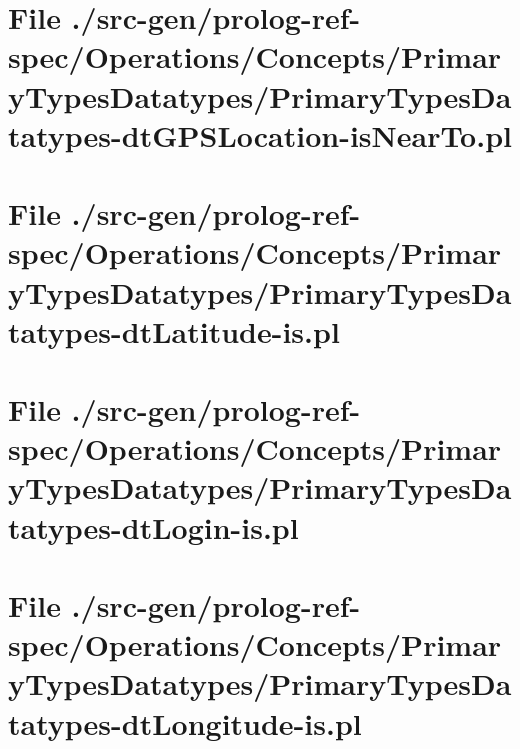 \section[File /src-gen.../PrimaryTypesDatatypes-dtGPSLocation-isNearTo.pl]{File ./src-gen/prolog-ref-spec/Operations/Concepts/PrimaryTypesDatatypes/PrimaryTypesDatatypes-dtGPSLocation-isNearTo.pl}
\scriptsize

\normalsize
	
\section[File /src-gen/prolog-ref-spec.../PrimaryTypesDatatypes-dtLatitude-is.pl]{File ./src-gen/prolog-ref-spec/Operations/Concepts/PrimaryTypesDatatypes/PrimaryTypesDatatypes-dtLatitude-is.pl}
\scriptsize

\normalsize
	
\section[File /src-gen/prolog-ref-spec/Operations.../PrimaryTypesDatatypes-dtLogin-is.pl]{File ./src-gen/prolog-ref-spec/Operations/Concepts/PrimaryTypesDatatypes/PrimaryTypesDatatypes-dtLogin-is.pl}
\scriptsize

\normalsize
	
\section[File /src-gen/prolog-ref-spec.../PrimaryTypesDatatypes-dtLongitude-is.pl]{File ./src-gen/prolog-ref-spec/Operations/Concepts/PrimaryTypesDatatypes/PrimaryTypesDatatypes-dtLongitude-is.pl}
\scriptsize

\normalsize
	
